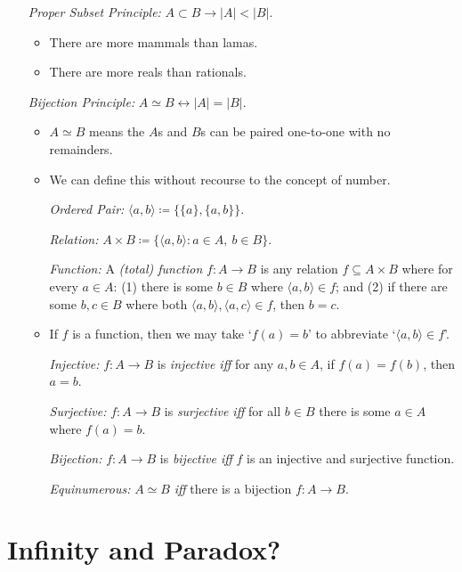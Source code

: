 \documentclass[a4paper, 11pt]{article} %
\newcommand{\tuple}[1]{\langle#1\rangle} %
\newcommand{\set}[1]{\lbrace#1\rbrace} %
\newcommand{\abs}[1]{|#1|} %
\begin{document}
\begin{enumerate}
  \item[\it Proper Subset Principle:] $A\subset B \rightarrow \abs{A}<\abs{B}$.
    \begin{itemize}[leftmargin=-.2in]
      \item There are more mammals than lamas.
      \item There are more reals than rationals.
    \end{itemize}
  \item[\it Bijection Principle:] $A\simeq B \leftrightarrow \abs{A}=\abs{B}$.
    \begin{itemize}[leftmargin=-.2in]
      \item $A\simeq B$ means the $A$s and $B$s can be paired one-to-one with no remainders.
      \item We can define this without recourse to the concept of number.
      \item[\it Ordered Pair:] $\tuple{a,b}\coloneq \set{\set{a},\set{a,b}}$.
      \item[\it Relation:] $A\times B\coloneq \set{\tuple{a,b}:a\in A,\ b\in B}$.
      \item[\it Function:] A \textit{(total) function} $f: A\to B$ is any relation $f\subseteq A\times B$ where for every $a\in A$: (1) there is some $b\in B$ where $\tuple{a,b}\in f$; and (2) if there are some $b,c\in B$ where both $\tuple{a,b},\tuple{a,c}\in f$, then $b=c$. 
      \item If $f$ is a function, then we may take `$f(a)=b$' to abbreviate `$\tuple{a,b}\in f$'. 
      \item[\it Injective:] $f: A\to B$ is \textit{injective iff} for any $a,b\in A$, if $f(a)=f(b)$, then $a=b$. 
      \item[\it Surjective:] $f: A\to B$ is \textit{surjective iff} for all $b\in B$ there is some $a\in A$ where $f(a)=b$.
      \item[\it Bijection:] $f: A\to B$ is \textit{bijective iff} $f$ is an injective and surjective function. 
      \item[\it Equinumerous:] $A\simeq B$ \textit{iff} there is a bijection $f: A \to B$.
    \end{itemize}
\end{enumerate}




\section*{Infinity and Paradox?}
\end{document}
